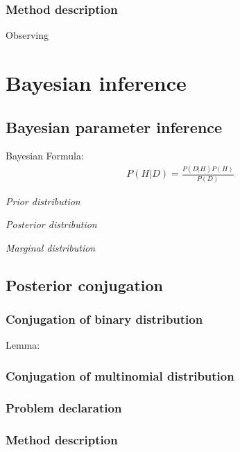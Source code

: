 \documentclass[12pt]{article}
\begin{document}
\subsubsection{Method description}
Observing


\section{Bayesian inference}
\subsection{Bayesian parameter inference}
Bayesian Formula:
\begin{align*}
  P(H|D) = \frac{P(D|H)P(H)}{P(D)}
\end{align*}


\textit{Prior distribution}


\textit{Posterior distribution}


\textit{Marginal distribution}



\subsection{Posterior conjugation}


\subsubsection{Conjugation of binary distribution}
Lemma:
\subsubsection{Conjugation of multinomial distribution}



\subsubsection{Problem declaration}
\subsubsection{Method description}

\printbibliography
\end{document}
